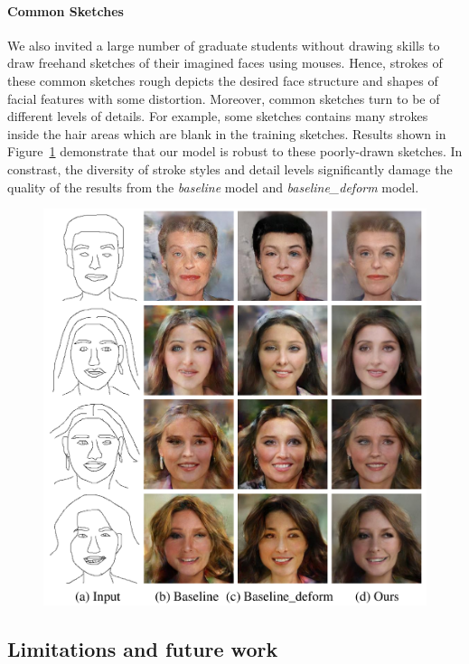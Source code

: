 \paragraph{Common Sketches}
We also invited a large number of graduate students without drawing skills to draw freehand sketches of their imagined faces using mouses. Hence, strokes of these common sketches rough depicts the desired face structure and shapes of facial features with some distortion. 
Moreover, common sketches turn to be of different levels of details. For example, some sketches contains many strokes inside the hair areas which are blank in the training sketches. 
%
Results shown in Figure~\ref{fig:common_sketches} demonstrate that our model is robust to these poorly-drawn sketches. 
In constrast, the diversity of stroke styles and detail levels significantly damage the quality of the results from the \textit{baseline} model and \textit{baseline\_deform} model.


\begin{figure}
	\includegraphics[width=0.9\linewidth]{figs/commonsketches}
	\caption{}
	\label{fig:common_sketches}
\end{figure}


\subsection{Limitations and future work}

